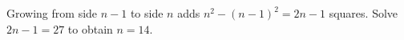 Growing from side $n-1$ to side $n$ adds $n^2-(n-1)^2=2n-1$ squares. Solve $2n-1=27$ to obtain $\boxed{n=14}$.
